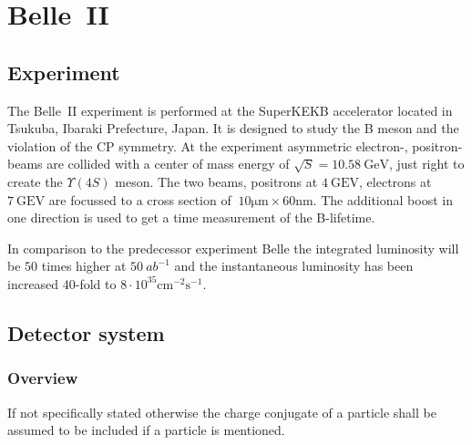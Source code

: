 \chapter{Belle~\RN{2}}
\label{chap:belle2_experiment}

\section{Experiment}
\label{sec:experimental}

The Belle~\RN{2} experiment is performed at the SuperKEKB accelerator located in Tsukuba, Ibaraki Prefecture, Japan. It is designed to study the B meson and the violation of the CP symmetry.
At the experiment asymmetric electron-, positron-beams are collided with a center of mass energy of $\sqrt{S} = 10.58 \mathrm{~GeV}$, just right to create the $\Upsilon (4S)$ meson. The two beams, positrons at $4 \mathrm{~GEV}$, electrons at $7 \mathrm{~GEV}$ are focussed to a cross section of $~10 \mathrm{\mu m} \times 60 \mathrm{nm}$. The additional boost in one direction is used to get a time measurement of the B-lifetime. %

In comparison to the predecessor experiment Belle the integrated luminosity will be $50$ times higher at $50~{ab}^{-1}$ and the instantaneous luminosity has been increased $40$-fold to $8 \cdot 10^{35} \mathrm{cm}^{-2} \mathrm{s}^{-1}$.

\section{Detector system}
\label{sec:detector_system}

\subsection{Overview}
\label{subsec:detector_system_overview}

If not specifically stated otherwise the charge conjugate of a particle shall be assumed to be included if a particle is mentioned.

